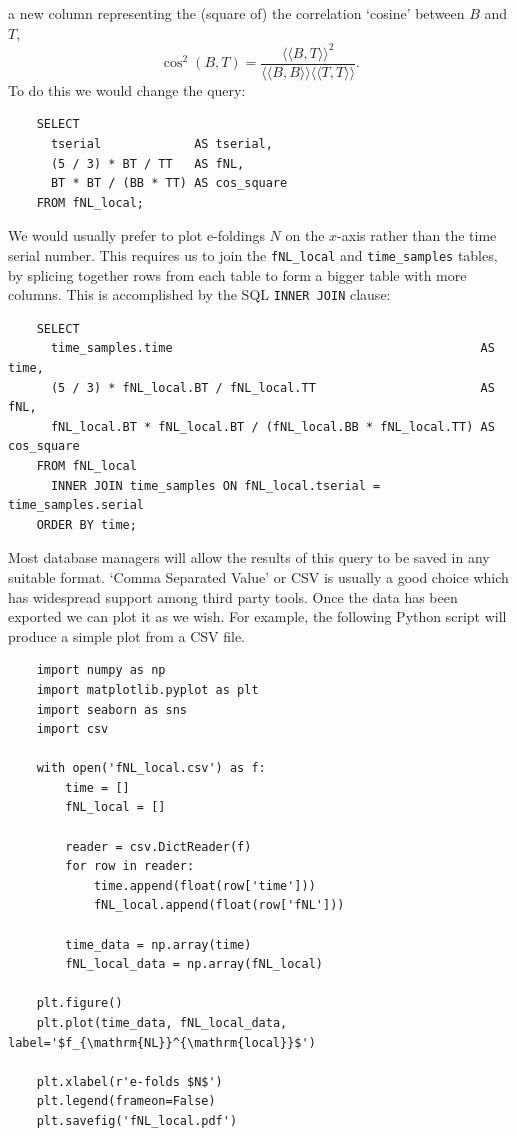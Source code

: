 \documentclass[11pt,a4paper]{article}
\newcommand{\iprod}[2]{\langle\!\langle {#1}, {#2} \rangle\!\rangle}
\begin{document}
a new column representing the (square of) the correlation `cosine'
between $B$ and $T$,
\begin{equation}
    \cos^2 (B,T) = \frac{\iprod{B}{T}^2}{\iprod{B}{B} \iprod{T}{T}} .
\end{equation}
To do this we would change the query:
\begin{verbatim}
    SELECT
      tserial             AS tserial,
      (5 / 3) * BT / TT   AS fNL,
      BT * BT / (BB * TT) AS cos_square
    FROM fNL_local;    
\end{verbatim}
We would usually prefer to plot e-foldings $N$ on the $x$-axis rather than the
time serial number.
This requires us to join the
\texttt{fNL_local} and
\texttt{time_samples} tables,
by splicing together rows from each table
to form a bigger table with more columns.
This is accomplished by the SQL
\texttt{INNER JOIN} clause:
\begin{verbatim}
    SELECT
      time_samples.time                                           AS time,
      (5 / 3) * fNL_local.BT / fNL_local.TT                       AS fNL,
      fNL_local.BT * fNL_local.BT / (fNL_local.BB * fNL_local.TT) AS cos_square
    FROM fNL_local
      INNER JOIN time_samples ON fNL_local.tserial = time_samples.serial
    ORDER BY time;
\end{verbatim}
Most database managers will allow the results of this query to be saved
in any suitable format.
`Comma Separated Value' or CSV is usually a good choice which has
widespread support among third party tools.
Once the data has been exported we can plot it as we wish.
For example, the following Python script will produce a simple plot
from a CSV file.
\begin{verbatim}
    import numpy as np
    import matplotlib.pyplot as plt
    import seaborn as sns
    import csv
    
    with open('fNL_local.csv') as f:
        time = []
        fNL_local = []
    
        reader = csv.DictReader(f)
        for row in reader:
            time.append(float(row['time']))
            fNL_local.append(float(row['fNL']))
    
        time_data = np.array(time)
        fNL_local_data = np.array(fNL_local)
    
    plt.figure()
    plt.plot(time_data, fNL_local_data, label='$f_{\mathrm{NL}}^{\mathrm{local}}$')
    
    plt.xlabel(r'e-folds $N$')
    plt.legend(frameon=False)
    plt.savefig('fNL_local.pdf')    
\end{verbatim}
\end{document}
